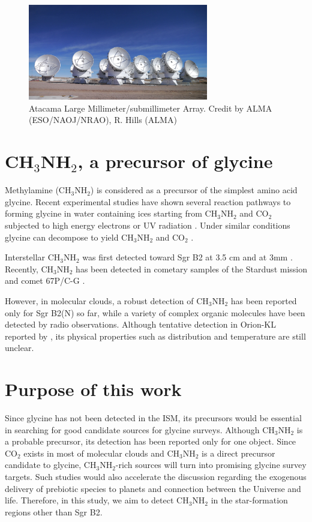 \begin{figure}[H]
  \centering
  \includegraphics[width=0.7\textwidth]{ALMA.eps}
  \caption{Atacama Large Millimeter/submillimeter Array. Credit by ALMA (ESO/NAOJ/NRAO), R. Hills (ALMA)}
\end{figure}

\newpage
\section{CH$_3$NH$_2$, a precursor of glycine}
Methylamine (CH$_3$NH$_2$) is considered as a precursor of the simplest amino acid glycine. 
Recent experimental studies have shown several reaction pathways to forming
glycine in water containing ices starting from CH$_3$NH$_2$ and CO$_2$
subjected to high energy electrons \citep{Holtom+2005} or UV radiation \citep{Bossa+2009, Lee+2009}. Under similar conditions glycine can decompose to yield CH$_3$NH$_2$ and CO$_2$
\citep{Ehrenfreund+2001}. 

Interstellar CH$_3$NH$_2$ was first detected toward Sgr B2 at 3.5 cm \citep{Fourikis+1974} 
and at 3mm \citep{Kaifu+1974}. Recently, CH$_3$NH$_2$ has been detected 
in cometary samples of the Stardust mission \citep{Glavin+2008} and comet 67P/C-G \citep{Altwegg+2016, Altwegg+2017}.

However, in molecular clouds, 
a robust detection of CH$_3$NH$_2$ has been reported only for Sgr B2(N) \citep{Halfen+2013}  so far, 
while a variety of complex organic molecules have been detected by radio observations.
Although tentative detection in Orion-KL reported by \citet{Pagani+2017}, its physical properties 
such as distribution and temperature are still unclear.

\newpage
\section{Purpose of this work}
Since glycine has not been detected in the ISM, its precursors would be essential in
searching for good candidate sources for glycine surveys. 
Although CH$_3$NH$_2$  is a probable precursor, its detection has been reported only for one object. 
Since CO$_2$ exists in most of molecular clouds and CH$_3$NH$_2$ is a direct precursor
candidate to glycine, CH$_3$NH$_2$-rich sources will turn into promising glycine survey targets. 
Such studies would also accelerate the discussion regarding the exogenous delivery of 
prebiotic species to planets and connection between the Universe and life.
Therefore, in this study, we aim to detect CH$_3$NH$_2$ in the star-formation regions other than Sgr B2.

